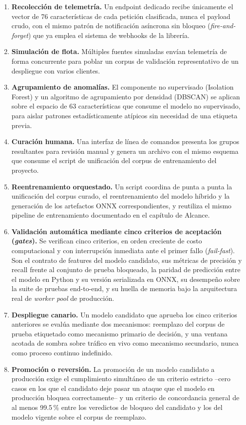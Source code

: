 \begin{enumerate}
    \item \textbf{Recolección de telemetría.} Un endpoint dedicado recibe únicamente el vector de 76 características de cada petición clasificada, nunca el payload crudo, con el mismo patrón de notificación asíncrona sin bloqueo (\textit{fire-and-forget}) que ya emplea el sistema de webhooks de la librería.
    \item \textbf{Simulación de flota.} Múltiples fuentes simuladas envían telemetría de forma concurrente para poblar un corpus de validación representativo de un despliegue con varios clientes.
    \item \textbf{Agrupamiento de anomalías.} El componente no supervisado (Isolation Forest) y un algoritmo de agrupamiento por densidad (DBSCAN) se aplican sobre el espacio de 63 características que consume el modelo no supervisado, para aislar patrones estadísticamente atípicos sin necesidad de una etiqueta previa.
    \item \textbf{Curación humana.} Una interfaz de línea de comandos presenta los grupos resultantes para revisión manual y genera un archivo con el mismo esquema que consume el script de unificación del corpus de entrenamiento del proyecto.
    \item \textbf{Reentrenamiento orquestado.} Un script coordina de punta a punta la unificación del corpus curado, el reentrenamiento del modelo híbrido y la generación de los artefactos ONNX correspondientes, y reutiliza el mismo pipeline de entrenamiento documentado en el capítulo de Alcance.
    \item \textbf{Validación automática mediante cinco criterios de aceptación (\textit{gates}).} Se verifican cinco criterios, en orden creciente de costo computacional y con interrupción inmediata ante el primer fallo (\textit{fail-fast}). Son el contrato de features del modelo candidato, sus métricas de precisión y recall frente al conjunto de prueba bloqueado, la paridad de predicción entre el modelo en Python y su versión serializada en ONNX, su desempeño sobre la suite de pruebas end-to-end, y su huella de memoria bajo la arquitectura real de \textit{worker pool} de producción.
    \item \textbf{Despliegue canario.} Un modelo candidato que aprueba los cinco criterios anteriores se evalúa mediante dos mecanismos: reemplazo del corpus de prueba etiquetado como mecanismo primario de decisión, y una ventana acotada de sombra sobre tráfico en vivo como mecanismo secundario, nunca como proceso continuo indefinido.
    \item \textbf{Promoción o reversión.} La promoción de un modelo candidato a producción exige el cumplimiento simultáneo de un criterio estricto --cero casos en los que el candidato deje pasar un ataque que el modelo en producción bloquea correctamente-- y un criterio de concordancia general de al menos 99.5\,\% entre los veredictos de bloqueo del candidato y los del modelo vigente sobre el corpus de reemplazo.
\end{enumerate}

